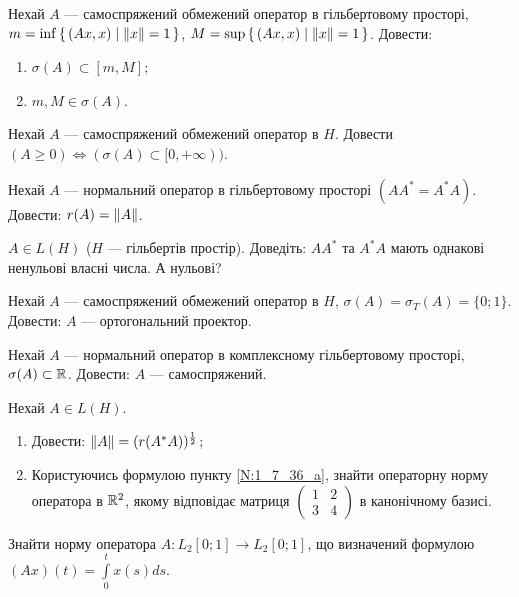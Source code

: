 
\begin{exercise}\label{N:1_7_30}
    Нехай $A$ --- самоспряжений обмежений оператор в гільбертовому просторі,
    $m = \inf\set{\left(Ax, x\right) \mid \left\lVert x\right\rVert=1}$,
    $M = \sup\set{\left(Ax, x\right) \mid \left\lVert x\right\rVert=1}$.
    Довести:
    \begin{enumerate}
        \item $\sigma(A) \subset [m,M]$;
        \item $m,M \in \sigma(A)$.
    \end{enumerate}
\end{exercise}

\begin{exercise}
    Нехай $A$ --- самоспряжений обмежений оператор в $H$. Довести $(A \geq 0)
    \Leftrightarrow (\sigma(A) \subset [0,+\infty))$.
\end{exercise}

\begin{exercise}
    Нехай $A$ --- нормальний оператор в гільбертовому просторі $(AA^* = A^* A)$.
    Довести: $r(A) = \left\lVert A\right\rVert$.
\end{exercise}

\begin{exercise}\label{N:1_7_33}
    $A \in L(H)$ ($H$ --- гільбертів простір). Доведіть: $AA^*$ та $A^* A$ мають
    однакові ненульові власні числа. А нульові?
\end{exercise}

\begin{exercise}
    Нехай $A$ --- самоспряжений обмежений оператор в $H$, $\sigma(A) = \sigma_T(A)
    = \{0;1\}$. Довести: $A$ --- ортогональний проектор.
\end{exercise}

\begin{exercise}
    Нехай $A$ --- нормальний оператор в комплексному гільбертовому просторі,
    $\sigma(A) \subset \mathbb{R}$. Довести: $A$ --- самоспряжений.
\end{exercise}

\begin{exercise}
    Нехай $A \in L(H)$.
    \begin{enumerate}
        \item\label{N:1_7_36_a} Довести: $\left\lVert A\right\rVert = (r(A^*A))^{\frac{1}{2}}$;
        \item Користуючись формулою пункту \ref{N:1_7_36_a},  знайти операторну
        норму оператора в $\mathbb{R}^2$, якому відповідає матриця $\begin{pmatrix}
        1 & 2 \\ 3 & 4 \end{pmatrix}$ в канонічному базисі.
    \end{enumerate}
\end{exercise}

\begin{exercise}
    Знайти норму оператора $A: L_2[0;1] \to L_2[0;1]$, що визначений формулою
    $(Ax)(t) = \int\limits^t_0 x(s)ds$.
\end{exercise}
